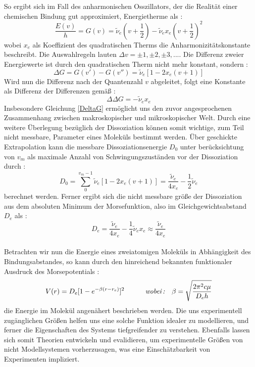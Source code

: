 So ergibt sich im Fall des anharmonischen Osszillators, der die Realität einer chemischen Bindung gut approximiert, Energietherme als :
\begin{equation}
\frac{E(v)}{h} = G(v) = \tilde{\nu}_e(v+\frac{1}{2})-\tilde{\nu}_ex_e(v+\frac{1}{2})^2
\end{equation}
wobei $x_e$ als Koeffizient des quadratischen Therms die Anharmonizitätskonstante beschreibt. Die Auswahlregeln lauten $\Delta v = \pm 1, \pm 2, \pm 3, ... $. Die Differenz zweier Energiewerte ist durch den quadratischen Therm nicht mehr konstant, sondern : 
\begin{equation}
\Delta G = G(v')-G(v'') = \tilde{\nu}_e[1-2x_e(v+1)]
\end{equation}
Wird nun die Differenz nach der Quantenzahl $v$ abgeleitet, folgt eine Konstante als Differenz der Differenzen gemäß : 
\begin{equation}
\Delta\Delta G = -\tilde{\nu}_ex_e
\label{DeltaG}
\end{equation}
Insbesondere Gleichung \ref{DeltaG} ermöglicht uns den zuvor angesprochenen Zusammenhang zwischen makroskopischer und mikroskopischer Welt. Durch eine weitere Überlegung bezüglich der Dissoziation können somit wichtige, zum Teil nicht messbare, Parameter eines Moleküls bestimmt werden. Über geschickte Extrapolation kann die messbare Dissoziationsenergie $D_0$ unter berücksichtung von $v_m$ als maximale Anzahl von Schwingungszuständen vor der Dissoziation durch : 
\begin{equation}
D_0 = \sum_{0}^{v_m-1}\tilde{\nu}_e[1-2x_e(v+1)]=\frac{\tilde{\nu}_e}{4x_e}-\frac{1}{2}\tilde{\nu}_e
\end{equation}
berechnet werden. Ferner ergibt sich die nicht messbare größe der Dissoziation aus dem absoluten Minimum der Morsefunktion, also im Gleichgewichtsabstand $D_e$ als : \\
\begin{equation}
D_e = \frac{\tilde{\nu}_e}{4x_e}-\frac{1}{4}\tilde{\nu}_ex_e\approx\frac{\tilde{\nu}_e}{4x_e}
\end{equation}
\\
Betrachten wir nun die Energie eines zweiatomigen Moleküls in Abhängigkeit des Bindungsabstandes, so kann durch den hinreichend bekannten funktionaler Ausdruck des Morsepotentials : \\
\begin{equation}
V(r) = D_e[1-e^{-\beta(r-r_e)}]^2 \quad\quad\quad \textit{wobei\,:}\quad \beta = \sqrt{\frac{2\pi^2c\mu}{D_eh}}
\end{equation}
die Energie im Molekül angenähert beschrieben werden. Die uns experimentell zugänglichen Größen helfen uns eine solche Funktion idealer zu modellieren, und ferner die Eigenschaften des Systems tiefgreifender zu verstehen. Ebenfalls lassen sich somit Theorien entwickeln und evalidieren, um experimentelle Größen von nicht Modellsystemen vorherzusagen, was eine Einschätzbarkeit von Experimenten impliziert.
%